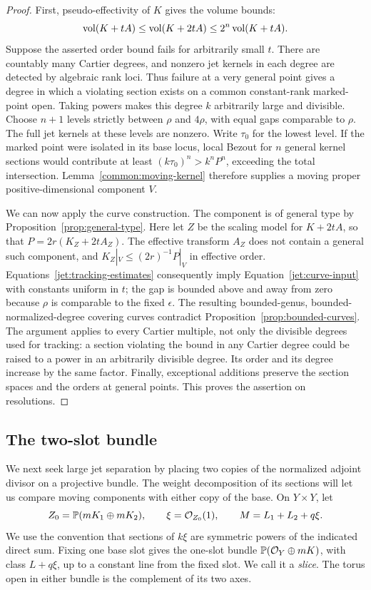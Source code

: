 \begin{proof}
First, pseudo-effectivity of \(K\) gives the volume bounds:
\[
 \operatorname{vol}(K+tA)\le\operatorname{vol}(K+2tA)\le2^n\operatorname{vol}(K+tA).
\]
Suppose the asserted order bound fails for arbitrarily small \(t\).
There are countably many Cartier degrees, and nonzero jet kernels in
each degree are detected by algebraic rank loci. Thus failure at a very
general point gives a degree in which a violating section exists on a
common constant-rank marked-point open. Taking powers makes this degree
\(k\) arbitrarily large and divisible. Choose \(n+1\) levels strictly
between \(\rho\) and \(4\rho\), with equal gaps comparable to \(\rho\).
The full jet kernels at these levels are nonzero. Write \(\tau_0\)
for the lowest level. If the marked point were isolated in its base
locus, local Bezout for \(n\) general kernel sections would contribute
at least \((k\tau_0)^n>k^nP^n\), exceeding the total intersection.
Lemma~\ref{common:moving-kernel} therefore supplies a moving proper
positive-dimensional component \(V\).

We can now apply the curve construction.  The component is of general
type by
Proposition~\ref{prop:general-type}. Here let \(Z\) be the scaling
model for \(K+2tA\), so that \(P=2r(K_Z+2tA_Z)\). The effective
transform \(A_Z\) does not contain a general such component, and
\(K_Z|_V\le(2r)^{-1}P|_V\) in effective order.
Equations~\eqref{jet:tracking-estimates} consequently imply
Equation~\eqref{jet:curve-input} with constants uniform in \(t\);
the gap is bounded above and away from zero because
\(\rho\) is comparable to the fixed \(\epsilon\).
The resulting bounded-genus, bounded-normalized-degree covering
curves contradict Proposition~\ref{prop:bounded-curves}.
The argument applies to every Cartier multiple, not only the divisible
degrees used for tracking: a section violating the bound in any Cartier
degree could be raised to a power in an arbitrarily divisible degree.
Its order and its degree increase by the same factor.
Finally, exceptional additions preserve the section spaces and the
orders at general points.  This proves the assertion on resolutions.
\end{proof}

\subsection{The two-slot bundle}

We next seek large jet separation by placing two copies of the
normalized adjoint divisor on a projective bundle.  The weight
decomposition of its sections will let us compare moving components
with either copy of the base.  On \(Y\times Y\), let
\begin{equation}\label{jet:two-slot}
 Z_0=\mathbb{P}(mK_1\oplus mK_2),\qquad
 \xi=\mathcal{O}_{Z_0}(1),\qquad M=L_1+L_2+q\xi.
\end{equation}
We use the convention that sections of \(k\xi\) are symmetric powers
of the indicated direct sum.  Fixing one base slot gives the
one-slot bundle
\(\mathbb{P}(\mathcal{O}_Y\oplus mK)\), with class \(L+q\xi\), up to a constant
line from the fixed slot.  We call it a \emph{slice}.
The torus open in either bundle is the complement of its two axes.

